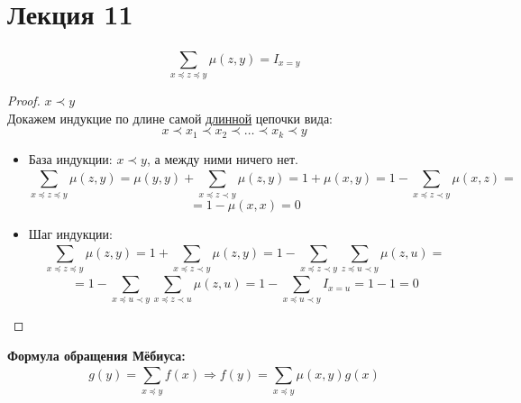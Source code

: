 \section{Лекция 11}
\begin{lemma}
\[
\sum_{x \preceq z \preceq y}^{} \mu(z, y) = I_{x = y}
\]
\end{lemma}
\begin{proof}
$x \prec y$ \\
Докажем индукцие по длине самой \underline{длинной} цепочки вида:
\[
  x \prec x_1 \prec x_2 \prec \ldots \prec x_k \prec y
\]
\begin{itemize}
  \item База индукции: $x \prec y$, а между ними ничего нет.
    \[
    \sum_{x \preceq z \preceq y}^{} \mu(z, y) = \mu(y, y) + \sum_{x \preceq z \prec y}^{} \mu(z, y) = 1 + \mu(x, y) = 1 - \sum_{x \preceq z \prec y}^{} \mu(x, z) =
    \]
    \[
    = 1 - \mu(x, x) = 0
    \]
  \item Шаг индукции: \[
  \sum_{x \preceq z \preceq y}^{} \mu(z, y) = 1 + \sum_{x \preceq z \prec y}^{} \mu(z, y) = 1 - \sum_{x \preceq z \prec y}^{} \sum_{z \preceq u \prec y}^{} \mu(z, u) = 
    \]
    \[
    = 1 - \sum_{x \preceq u \prec y}^{} \sum_{x \preceq z \prec u}^{} \mu(z, u) = 1 - \sum_{x \preceq u \prec y}^{} I_{x = u} = 1 - 1 = 0
    \]
\end{itemize}
\end{proof}
\begin{theorem}
\textbf{Формула обращения Мёбиуса:} \\
\[
g(y) = \sum_{x \preceq y}^{} f(x) \Rightarrow f(y) = \sum_{x \preceq y}^{} \mu(x, y) g(x)
\]
\end{theorem}
